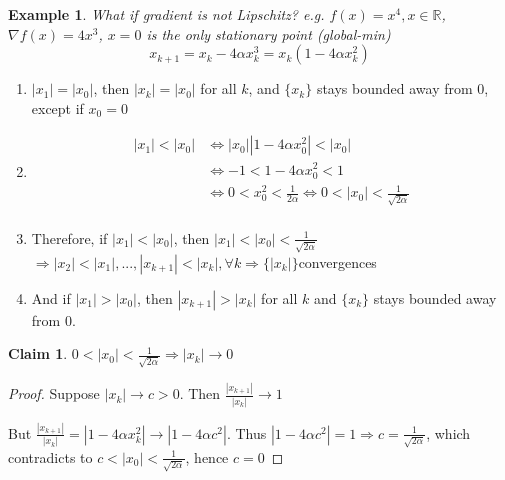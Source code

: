 \documentclass[11pt,a4paper]{article}
\newtheorem{claim}{Claim}
\newtheorem{example}{Example}
\begin{document}
\begin{example}
What if gradient is not Lipschitz? e.g. $f(x)=x^4,x\in \mathbb{R}$, $\nabla f(x)=4x^3$, $x=0$ is the only stationary point (global-min)
$$x_{k+1}=x_k-4\alpha x_k^3=x_k(1-4\alpha x_k^2)$$
\end{example}
\begin{enumerate}[$\bullet$]
    \item $|x_1|=|x_0|$, then $|x_k|=|x_0|$ for all $k$, and $\{x_k\}$ stays bounded away from $0$, except if $x_0=0$
    \item \begin{equation}
        \begin{aligned}
            |x_1|<|x_0| &\Leftrightarrow	|x_0||1-4\alpha x_0^2|<|x_0|\\
            &\Leftrightarrow -1<1-4\alpha x_0^2<1\\
            &\Leftrightarrow 0<x_0^2<\frac{1}{2\alpha} \Leftrightarrow	0<|x_0|<\frac{1}{\sqrt{2\alpha}}\\
        \end{aligned}
        \nonumber
    \end{equation}
    \item Therefore, if $|x_1|<|x_0|$, then $|x_1|<|x_0|<\frac{1}{\sqrt{2\alpha}}$ $\Rightarrow	|x_2|<|x_1|,...,|x_{k+1}|<|x_k|,\forall k \Rightarrow \{|x_k|\}$convergences
    \item And if $|x_1|>|x_0|$, then $|x_{k+1}|>|x_k|$ for all $k$ and $\{x_k\}$ stays bounded away from $0$.
\end{enumerate}
\begin{claim}
$0<|x_0|<\frac{1}{\sqrt{2\alpha}} \Rightarrow |x_k| \rightarrow	0$
\end{claim}
\begin{proof}
Suppose $|x_k| \rightarrow	c>0$. Then $\frac{|x_{k+1}|}{|x_k|} \rightarrow	1$

But $\frac{|x_{k+1}|}{|x_k|} = |1-4\alpha x_k^2| \rightarrow |1-4\alpha c^2|$. Thus $|1-4\alpha c^2|=1 \Rightarrow	c=\frac{1}{\sqrt{2\alpha}}$, which contradicts to $c<|x_0|<\frac{1}{\sqrt{2\alpha}}$, hence $c=0$

\end{proof}
\end{document}
